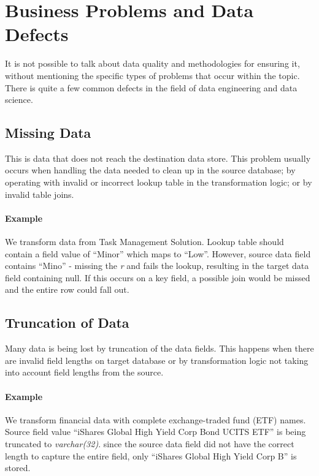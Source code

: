 \section{Business Problems and Data Defects}

It is not possible to talk about data quality and methodologies for ensuring it, without mentioning the specific types of problems that occur within the topic.
There is quite a few common defects in the field of data engineering and data science.

\subsection*{Missing Data}

This is data that does not reach the destination data store.
This problem usually occurs when handling the data needed to clean up in the source database; by operating with invalid or incorrect lookup table in the transformation logic; or by invalid table joins.

\paragraph*{Example} We transform data from Task Management Solution.
Lookup table should contain a field value of \enquote{Minor} which maps to \enquote{Low}.
However, source data field contains \enquote{Mino} - missing the \textit{r} and fails the lookup, resulting in the target data field containing null.
If this occurs on a key field, a possible join would be missed and the entire row could fall out.

\subsection*{Truncation of Data}

Many data is being lost by truncation of the data fields.
This happens when there are invalid field lengths on target database or by transformation logic not taking into account field lengths from the source.

\paragraph*{Example} We transform financial data with complete exchange-traded fund (ETF) names.
Source field value \enquote{iShares Global High Yield Corp Bond UCITS ETF} is being truncated to \textit{varchar(32)}.
since the source data field did not have the correct length to capture the entire field, only \enquote{iShares Global High Yield Corp B} is stored.

